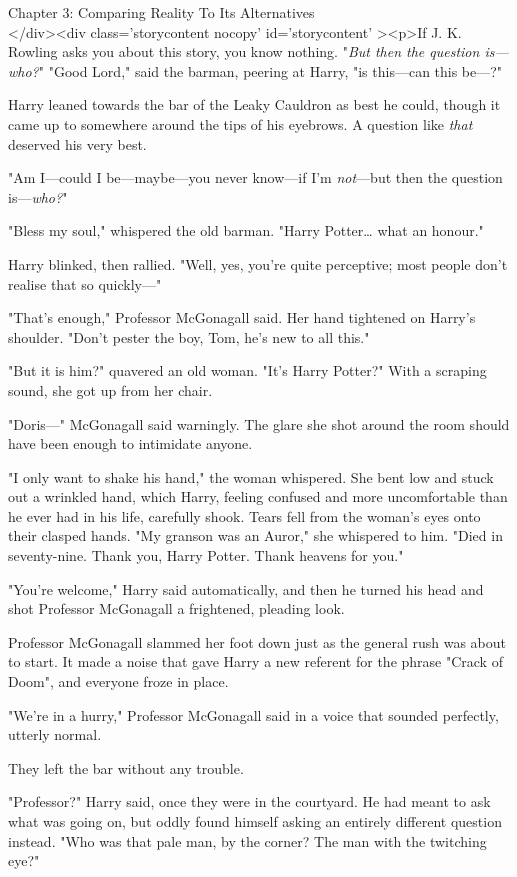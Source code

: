
Chapter 3: Comparing Reality To Its Alternatives\\
</div><div  class='storycontent nocopy' id='storycontent' ><p>If J. K. Rowling 
asks you about this story, you know nothing.
\sbreak
"\emph{But then the question is---who?}"
\sbreak
"Good Lord," said the barman, peering at Harry, "is this---can this be---?"

Harry leaned towards the bar of the Leaky Cauldron as best he could, though it 
came up to somewhere around the tips of his eyebrows. A question like 
\emph{that} deserved his very best.

"Am I---could I be---maybe---you never know---if I'm\emph{ not}---but then the 
question is---\emph{who?}"

"Bless my soul," whispered the old barman. "Harry Potter{\ldots} what an 
honour."

Harry blinked, then rallied. "Well, yes, you're quite perceptive; most people 
don't realise that so quickly---"

"That's enough," Professor McGonagall said. Her hand tightened on Harry's 
shoulder. "Don't pester the boy, Tom, he's new to all this."

"But it is him?" quavered an old woman. "It's Harry Potter?" With a scraping 
sound, she got up from her chair.

"Doris---" McGonagall said warningly. The glare she shot around the room should 
have been enough to intimidate anyone.

"I only want to shake his hand," the woman whispered. She bent low and stuck 
out a wrinkled hand, which Harry, feeling confused and more uncomfortable than 
he ever had in his life, carefully shook. Tears fell from the woman's eyes onto 
their clasped hands. "My granson was an Auror," she whispered to him. "Died in 
seventy-nine. Thank you, Harry Potter. Thank heavens for you."

"You're welcome," Harry said automatically, and then he turned his head and 
shot Professor McGonagall a frightened, pleading look.

Professor McGonagall slammed her foot down just as the general rush was about 
to start. It made a noise that gave Harry a new referent for the phrase "Crack 
of Doom", and everyone froze in place.

"We're in a hurry," Professor McGonagall said in a voice that sounded 
perfectly, utterly normal.

They left the bar without any trouble.

"Professor?" Harry said, once they were in the courtyard. He had meant to ask 
what was going on, but oddly found himself asking an entirely different 
question instead. "Who was that pale man, by the corner? The man with the 
twitching eye?"

